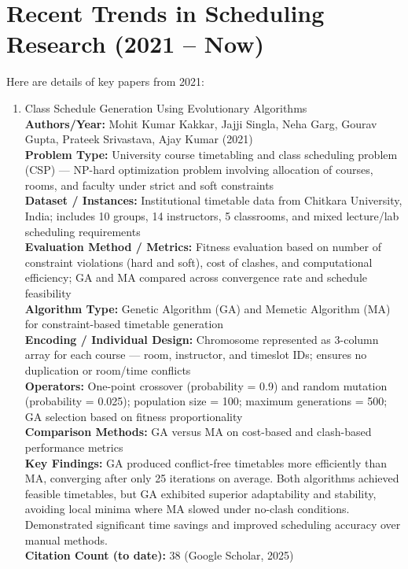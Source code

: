 \documentclass[a4paper,12pt]{article}
\begin{document}
\section{Recent Trends in Scheduling Research (2021 – Now)}
Here are details of key papers from 2021:
\begin{enumerate}[leftmargin=2em, labelwidth=1em, labelsep=0.5em, itemsep=1ex]

  \item Class Schedule Generation Using Evolutionary Algorithms \\
    \textbf{Authors/Year:} Mohit Kumar Kakkar, Jajji Singla, Neha Garg, Gourav Gupta, Prateek Srivastava, Ajay Kumar (2021) \\  
    \textbf{Problem Type:} University course timetabling and class scheduling problem (CSP) — NP-hard optimization problem involving allocation of courses, rooms, and faculty under strict and soft constraints \\  
    \textbf{Dataset / Instances:} Institutional timetable data from Chitkara University, India; includes 10 groups, 14 instructors, 5 classrooms, and mixed lecture/lab scheduling requirements \\  
    \textbf{Evaluation Method / Metrics:} Fitness evaluation based on number of constraint violations (hard and soft), cost of clashes, and computational efficiency; GA and MA compared across convergence rate and schedule feasibility \\  
    \textbf{Algorithm Type:} Genetic Algorithm (GA) and Memetic Algorithm (MA) for constraint-based timetable generation \\  
    \textbf{Encoding / Individual Design:} Chromosome represented as 3-column array for each course — room, instructor, and timeslot IDs; ensures no duplication or room/time conflicts \\  
    \textbf{Operators:} One-point crossover (probability = 0.9) and random mutation (probability = 0.025); population size = 100; maximum generations = 500; GA selection based on fitness proportionality \\  
    \textbf{Comparison Methods:} GA versus MA on cost-based and clash-based performance metrics \\  
    \textbf{Key Findings:} GA produced conflict-free timetables more efficiently than MA, converging after only 25 iterations on average. Both algorithms achieved feasible timetables, but GA exhibited superior adaptability and stability, avoiding local minima where MA slowed under no-clash conditions. Demonstrated significant time savings and improved scheduling accuracy over manual methods. \\  
    \textbf{Citation Count (to date):} 38 (Google Scholar, 2025) \\[2ex]


\end{enumerate}
\end{document}
